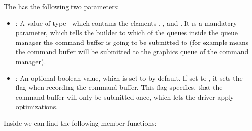 The  has the following two parameters:

\begin{itemize}
    \item \textbf{}: A value of type , which contains the elements , ,  and . It is a mandatory parameter, which tells the builder to which of the queues inside the queue manager the command buffer is going to be submitted to (for example  means the command buffer will be submitted to the graphics queue of the command manager).
    \item \textbf{}: An optional boolean value, which is set to  by default. If set to , it sets the  flag when recording the command buffer. This flag specifies, that the command buffer will only be submitted once, which lets the driver apply optimizations.
\end{itemize}

Inside  we can find the following member functions:

